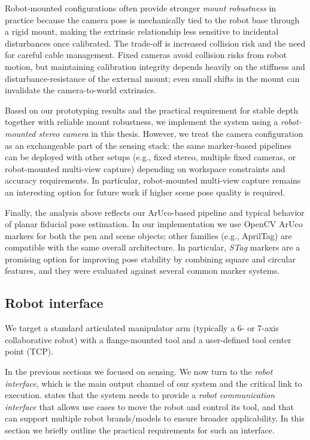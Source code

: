 Robot-mounted configurations often provide stronger \emph{mount robustness} in practice because the camera pose is mechanically tied to the robot base through a rigid mount, making the extrinsic relationship less sensitive to incidental disturbances once calibrated. The trade-off is increased collision risk and the need for careful cable management. Fixed cameras avoid collision risks from robot motion, but maintaining calibration integrity depends heavily on the stiffness and disturbance-resistance of the external mount; even small shifts in the mount can invalidate the camera-to-world extrinsics.

Based on our prototyping results and the practical requirement for stable depth together with reliable mount robustness, we implement the system using a \emph{robot-mounted stereo camera} in this thesis. However, we treat the camera configuration as an exchangeable part of the sensing stack: the same marker-based pipelines can be deployed with other setups (e.g., fixed stereo, multiple fixed cameras, or robot-mounted multi-view capture) depending on workspace constraints and accuracy requirements. In particular, robot-mounted multi-view capture remains an interesting option for future work if higher scene pose quality is required.

Finally, the analysis above reflects our ArUco-based pipeline and typical behavior of planar fiducial pose estimation. In our implementation we use OpenCV ArUco markers for both the pen and scene objects; other families (e.g., AprilTag) are compatible with the same overall architecture. In particular, \emph{STag} markers \cite{BENLIGIRAY2019158} are a promising option for improving pose stability by combining square and circular features, and they were evaluated against several common marker systems.


\subsection{Robot interface} \label{subsec:ch2_analysis_robot_interface}

We target a standard articulated manipulator arm (typically a 6- or 7-axis collaborative robot) with a flange-mounted tool and a user-defined tool center point (TCP).

In the previous sections we focused on sensing. We now turn to the \emph{robot interface}, which is the main output channel of our system and the critical link to execution.  states that the system needs to provide a \emph{robot communication interface} that allows use cases to move the robot and control its tool, and that can support multiple robot brands/models to ensure broader applicability. In this section we briefly outline the practical requirements for such an interface.

